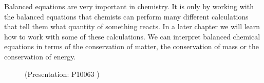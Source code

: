     \label{m38727*eip-429}Balanced equations are very important in chemistry. It is only by working with the balanced equations that chemists can perform many different calculations that tell them what quantity of something reacts. In a later chapter we will learn how to work with some of these calculations. We can interpret balanced chemical equations in terms of the conservation of matter, the conservation of mass or the conservation of energy. \label{m38727*eip-366}
    \setcounter{subfigure}{0}
	\begin{figure}[H] %
    \label{m38727*slidesharemedia}\label{m38727*slideshareflash} { (Presentation:  P10063 )} \end{figure}
